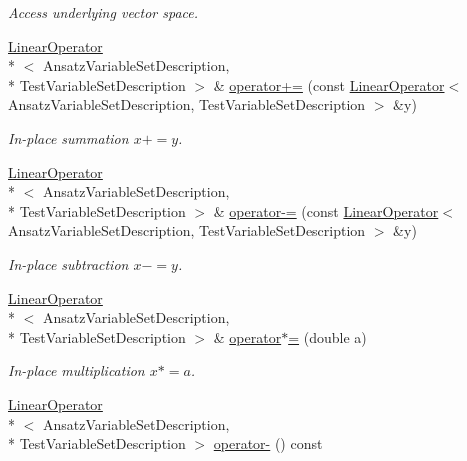 \begin{DoxyCompactItemize}
\begin{DoxyCompactList}\small\item\em Access underlying vector space. \end{DoxyCompactList}\item 
\hyperlink{classSpacy_1_1Kaskade_1_1LinearOperator}{Linear\-Operator}\\*
$<$ Ansatz\-Variable\-Set\-Description, \\*
Test\-Variable\-Set\-Description $>$ \& \hyperlink{classSpacy_1_1AddArithmeticOperators_afad1d01e1e8c6f75290ac46d9b047ea8}{operator+=} (const \hyperlink{classSpacy_1_1Kaskade_1_1LinearOperator}{Linear\-Operator}$<$ Ansatz\-Variable\-Set\-Description, Test\-Variable\-Set\-Description $>$ \&y)
\begin{DoxyCompactList}\small\item\em In-\/place summation $ x+=y$. \end{DoxyCompactList}\item 
\hyperlink{classSpacy_1_1Kaskade_1_1LinearOperator}{Linear\-Operator}\\*
$<$ Ansatz\-Variable\-Set\-Description, \\*
Test\-Variable\-Set\-Description $>$ \& \hyperlink{classSpacy_1_1AddArithmeticOperators_a9fa91e177d13203cfe8cfa991c64ca36}{operator-\/=} (const \hyperlink{classSpacy_1_1Kaskade_1_1LinearOperator}{Linear\-Operator}$<$ Ansatz\-Variable\-Set\-Description, Test\-Variable\-Set\-Description $>$ \&y)
\begin{DoxyCompactList}\small\item\em In-\/place subtraction $ x-=y$. \end{DoxyCompactList}\item 
\hyperlink{classSpacy_1_1Kaskade_1_1LinearOperator}{Linear\-Operator}\\*
$<$ Ansatz\-Variable\-Set\-Description, \\*
Test\-Variable\-Set\-Description $>$ \& \hyperlink{classSpacy_1_1AddArithmeticOperators_a1d3db95b24fd2bc1de712c9e04c47e2f}{operator$\ast$=} (double a)
\begin{DoxyCompactList}\small\item\em In-\/place multiplication $ x*=a$. \end{DoxyCompactList}\item 
\hyperlink{classSpacy_1_1Kaskade_1_1LinearOperator}{Linear\-Operator}\\*
$<$ Ansatz\-Variable\-Set\-Description, \\*
Test\-Variable\-Set\-Description $>$ \hyperlink{classSpacy_1_1AddArithmeticOperators_a5acd030bf265d130983fd6e3c5b68be5}{operator-\/} () const

\end{DoxyCompactItemize}
